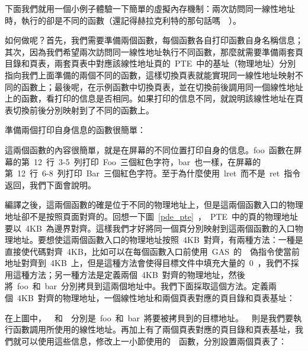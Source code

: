 下面我們就用一個小例子體驗一下簡單的虛擬內存機制：兩次訪問同一線性地址時，執行的卻是不同的函數（還記得赫拉克利特的那句話嗎~\smiley~）。

如何做呢？首先，我們需要準備兩個函數，每個函數各自打印函數自身名稱信息；其次，因為我們希望兩次訪問同一線性地址執行不同函數，那麼就需要準備兩套頁目錄和頁表，兩套頁表中對應該線性地址頁的~PTE~中的基址（物理地址）分別指向我們上面準備的兩個不同的函數，這樣切換頁表就能實現同一線性地址映射不同的函數上；最後呢，在示例函數中切換頁表，並在切換前後調用同一個線性地址上的函數，看打印的信息是否相同。如果打印的信息不同，就說明該線性地址在頁表切換前後分別映射到了不同的函數上。

準備兩個打印自身信息的函數很簡單：


這兩個函數的內容很簡單，就是在屏幕的不同位置打印自身的信息。foo~函數在屏幕的第~12~行~3-5~列打印~Foo~三個紅色字符，bar~也一樣，在屏幕的第~12~行~6-8~列打印~Bar~三個紅色字符。至于為什麼使用~lret~而不是~ret~指令返回，我們下面會說明。

編譯之後，這兩個函數的確是位于不同的物理地址上，但是這兩個函數入口的物理地址卻不是按照頁面對齊的。回想一下圖~\ref{pde_pte}~，~PTE~中的頁的物理地址要以~4KB~為邊界對齊。這樣我們才好將同一個頁分別映射到這兩個函數的入口物理地址。要想使這兩個函數入口的物理地址按照~4KB~對齊，有兩種方法：一種是直接使代碼對齊~4KB，比如可以在每個函數入口前使用~GAS~的~~偽指令使當前地址對齊到~4KB~上，但是這種方法會使得目標文件中填充大量的~0~，我們不採用這種方法；另一種方法是定義兩個~4KB~對齊的物理地址，然後將~foo~和~bar~分別拷貝到這兩個地址中。我們下面採取這個方法。定義兩個~4KB~對齊的物理地址，一個線性地址和兩個頁表對應的頁目錄和頁表基址：


在上圖中，~~和~~分別是~foo~和~bar~將要被拷貝到的目標地址。~~則是我們要執行函數調用所使用的線性地址。再加上有了兩個頁表對應的頁目錄和頁表基址，我們就可以使用這些信息，修改上一小節使用的~~函數，分別設置兩個頁表了：

